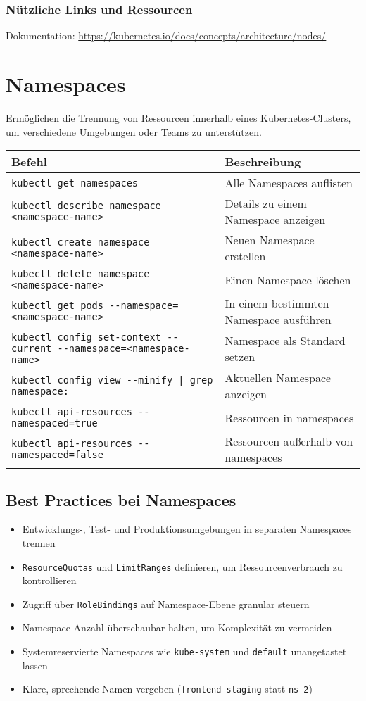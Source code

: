 \subsubsection{Nützliche Links und Ressourcen}
Dokumentation: \url{https://kubernetes.io/docs/concepts/architecture/nodes/}

\newpage
\section{Namespaces}
Ermöglichen die Trennung von Ressourcen innerhalb eines Kubernetes-Clusters, um verschiedene Umgebungen oder Teams zu unterstützen. \\

\noindent
\begin{tabular}{|p{}|p{}|}
\hline
\textbf{Befehl} & \textbf{Beschreibung} \\
\hline
\texttt{kubectl get namespaces} & Alle Namespaces auflisten \\
\texttt{kubectl describe namespace <namespace-name>} & Details zu einem Namespace anzeigen \\
\texttt{kubectl create namespace <namespace-name>} & Neuen Namespace erstellen \\
\texttt{kubectl delete namespace <namespace-name>} & Einen Namespace löschen \\
\texttt{kubectl get pods {-}{-}namespace=<namespace-name>} & In einem bestimmten Namespace ausführen \\
\texttt{kubectl config set-context {-}{-}current {-}{-}namespace=<namespace-name>} & Namespace als Standard setzen \\
\texttt{kubectl config view {-}{-}minify | grep namespace:} & Aktuellen Namespace anzeigen \\
\texttt{kubectl api-resources {-}{-}namespaced=true} & Ressourcen in namespaces \\
\texttt{kubectl api-resources {-}{-}namespaced=false} & Ressourcen außerhalb von namespaces\\
\hline
\end{tabular}

\subsection{Best Practices bei Namespaces}
\begin{itemize}
    \item Entwicklungs-, Test- und Produktionsumgebungen in separaten Namespaces trennen
    \item \texttt{ResourceQuotas} und \texttt{LimitRanges} definieren, um Ressourcenverbrauch zu kontrollieren
    \item Zugriff über \texttt{RoleBindings} auf Namespace-Ebene granular steuern
    \item Namespace-Anzahl überschaubar halten, um Komplexität zu vermeiden
    \item Systemreservierte Namespaces wie \texttt{kube-system} und \texttt{default} unangetastet lassen
    \item Klare, sprechende Namen vergeben (\texttt{frontend-staging} statt \texttt{ns-2})
\end{itemize}


